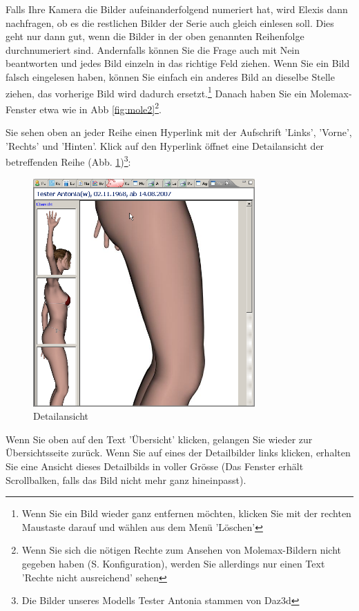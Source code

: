 \documentclass[a4paper]{scrartcl}
\begin{document}
 Falls Ihre Kamera die Bilder aufeinanderfolgend numeriert hat, wird Elexis dann nachfragen, ob es die restlichen Bilder der Serie auch gleich einlesen soll. Dies geht nur dann gut, wenn die Bilder in der oben genannten Reihenfolge durchnumeriert sind. Andernfalls können Sie die Frage auch mit Nein beantworten und jedes Bild einzeln in das richtige Feld ziehen. Wenn Sie ein Bild falsch eingelesen haben, können Sie einfach ein anderes Bild an dieselbe Stelle ziehen, das vorherige Bild wird dadurch ersetzt.\footnote{Wenn Sie ein Bild wieder ganz entfernen möchten, klicken Sie mit der rechten Maustaste darauf und wählen aus dem Menü 'Löschen'}
Danach haben Sie ein Molemax-Fenster etwa wie in Abb \ref{fig:mole2}\footnote{Wenn Sie sich die nötigen Rechte zum Ansehen von Molemax-Bildern nicht gegeben haben (S. Konfiguration), werden Sie allerdings nur einen Text 'Rechte nicht ausreichend' sehen}.

Sie sehen oben an jeder Reihe einen Hyperlink mit der Aufschrift 'Links', 'Vorne', 'Rechts' und 'Hinten'. Klick auf den Hyperlink öffnet eine Detailansicht der betreffenden Reihe (Abb. \ref{fig:mole3})\footnote{Die Bilder unseres Modells Tester Antonia stammen von Daz3d}:

 \begin{figure}[htp]
     \begin{center}
         \includegraphics[width=8.5cm]{molemax3}
         \caption{Detailansicht}
         \label{fig:mole3}
     \end{center}
 \end{figure}

Wenn Sie oben auf den Text 'Übersicht' klicken, gelangen Sie wieder zur Übersichtsseite zurück. Wenn Sie auf eines der Detailbilder links klicken, erhalten Sie eine Ansicht dieses Detailbilds in voller Grösse (Das Fenster erhält Scrollbalken, falls das Bild nicht mehr ganz hineinpasst).
\end{document}
